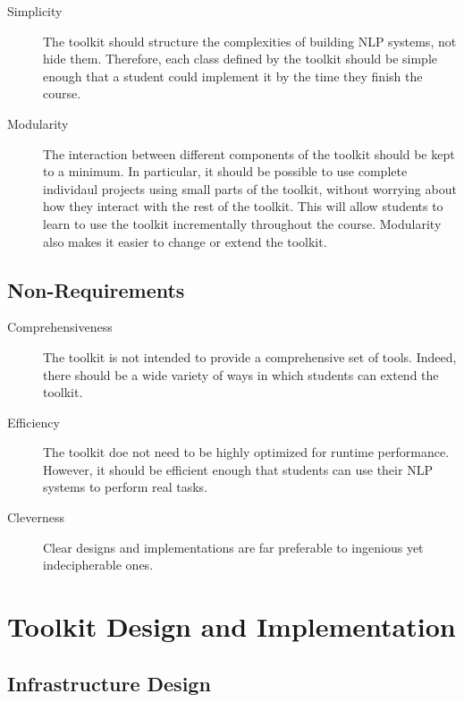 \documentclass{article}
\begin{document}
\begin{description}
\item[Simplicity] The toolkit should structure the complexities of
building NLP systems, not hide them.  Therefore, each class defined by 
the toolkit should be simple enough that a student could implement it
by the time they finish the course.

\item[Modularity] The interaction between different components of the
toolkit should be kept to a minimum.  In particular, it should be
possible to use complete individaul projects using small parts of the
toolkit, without worrying about how they interact with the rest of the
toolkit.  This will allow students to learn to use the toolkit
incrementally throughout the course.  Modularity also makes it easier
to change or extend the toolkit.
\end{description}

\subsection{Non-Requirements}

\begin{description}
\item[Comprehensiveness] The toolkit is not intended to provide a
comprehensive set of tools.  Indeed, there should be a wide variety of 
ways in which students can extend the toolkit.

\item[Efficiency] The toolkit doe not need to be highly optimized for
runtime performance.  However, it should be efficient enough that
students can use their NLP systems to perform real tasks.

\item[Cleverness] Clear designs and implementations are far preferable 
to ingenious yet indecipherable ones.
\end{description}

\section{Toolkit Design and Implementation}

\subsection{Infrastructure Design}
\end{document}
